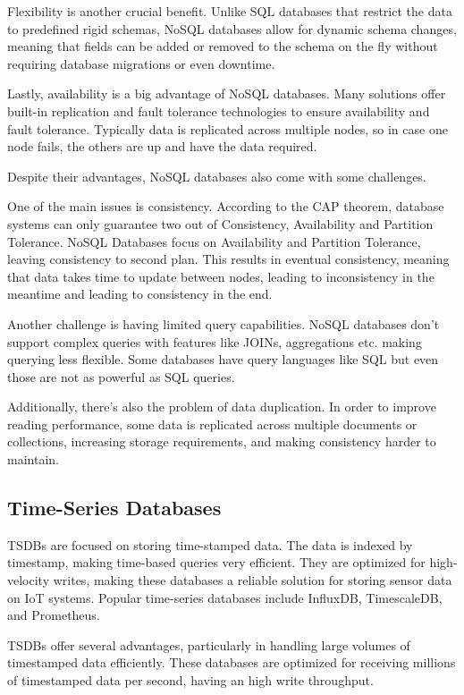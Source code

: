 Flexibility is another crucial benefit.
Unlike \gls{SQL} databases that restrict the data to predefined rigid schemas,
\gls{NoSQL} databases allow for dynamic schema changes, meaning that fields can
be added or removed to the schema on the fly without requiring database
migrations or even downtime.

Lastly, availability is a big advantage of \gls{NoSQL} databases.
Many solutions offer built-in replication and fault tolerance
technologies to ensure availability and fault tolerance. Typically data is
replicated across multiple nodes, so in case one node fails, the others
are up and have the data required.

Despite their advantages, \gls{NoSQL} databases also come with some challenges.

One of the main issues is consistency.
According to the \gls{CAP} theorem, database systems can only guarantee two out of
Consistency, Availability and Partition Tolerance. \gls{NoSQL} Databases focus on
Availability and Partition Tolerance, leaving consistency to second plan.
This results in eventual consistency, meaning that data takes time to update
between nodes, leading to inconsistency in the meantime and leading to
consistency in the end.

Another challenge is having limited query capabilities.
\gls{NoSQL} databases don't support complex queries with features like JOINs,
aggregations etc. making querying less flexible. Some databases have query
languages like \gls{SQL} but even those are not as powerful as \gls{SQL} queries.

Additionally, there's also the problem of data duplication.
In order to improve reading performance, some data is replicated across
multiple documents or collections, increasing storage requirements, and
making consistency harder to maintain.
\subsection{Time-Series Databases}
\gls{TSDB}s are focused on storing time-stamped data. The
data is indexed by timestamp, making time-based queries very efficient. They are
optimized for high-velocity writes, making these databases a reliable solution
for storing sensor data on \gls{IoT} systems. Popular time-series databases include
InfluxDB, TimescaleDB, and Prometheus.

\gls{TSDB}s offer several advantages, particularly in handling large volumes
of timestamped data efficiently. These databases are optimized for receiving
millions of timestamped data per second, having an high write throughput.

